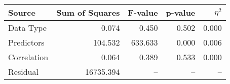 \begin{small}
\begin{ttfamily}
\begin{tabular}{lrrrr}
\toprule
Source & Sum of Squares & F-value & p-value & $\eta^2$ \\
\midrule
Data Type & 0.074 & 0.450 & 0.502 & 0.000 \\
Predictors & 104.532 & 633.633 & 0.000 & 0.006 \\
Correlation & 0.064 & 0.389 & 0.533 & 0.000 \\
Residual & 16735.394 & -- & -- & -- \\
\bottomrule
\end{tabular}
\end{ttfamily}
\end{small}
